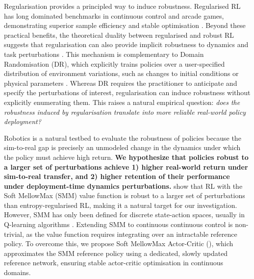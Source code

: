 \documentclass{article} %
\begin{document}
    Regularisation provides a principled way to induce robustness. Regularised RL has long dominated benchmarks in continuous control and arcade games, demonstrating superior sample efficiency and stable optimisation \citep{dam2024unified_tree_search, haarnoja2018soft, ahmed_le_roux_2019_entropy_impact_pol_opt}.
    Beyond these practical benefits, the theoretical duality between regularised and robust RL suggests that regularisation can also provide implicit robustness to dynamics and task perturbations \citep{derman_twice_regularized, eysenbach2022maximum, pmlr-v130-husain21a_reg_pol_rew_rob, brekelmans2022_divergence_robustness}.
    This mechanism is complementary to Domain Randomisation (DR), which explicitly trains policies over a user-specified distribution of environment variations, such as changes to initial conditions or physical parameters \citep{eysenbach2022maximum, Mittal_Isaac_Lab_2025}.
    Whereas DR requires the practitioner to anticipate and specify the perturbations of interest, regularisation can induce robustness without explicitly enumerating them.
    This raises a natural empirical question: \textit{does the robustness induced by regularisation translate into more reliable real-world policy deployment?}

    Robotics is a natural testbed to evaluate the robustness of policies because the sim-to-real gap is precisely an unmodeled change in the dynamics under which the policy must achieve high return.
    \textbf{We hypothesize that policies robust to a larger set of perturbations achieve 1) higher real-world return under sim-to-real transfer, and 2) higher retention of their performance under deployment-time dynamics perturbations.}
    \citet{TGM_2025_jiralerspong} show that RL with the Soft MellowMax (SMM) value function is robust to a larger set of perturbations than entropy-regularised RL, making it a natural target for our investigation.
    However, SMM has only been defined for discrete state-action spaces, usually in Q-learning algorithms \citep{asadi2017alternative_mellowmax, gan2021stabilizing_soft_mellowmax}.
    Extending SMM to continuous continuous control is non-trivial, as the value function requires integrating over an intractable reference policy. To overcome this, we propose Soft MellowMax Actor-Critic (\ourMethod), which approximates the SMM reference policy using a dedicated, slowly updated reference network, ensuring stable actor-critic optimisation in continuous domains. 
    
\end{document}
